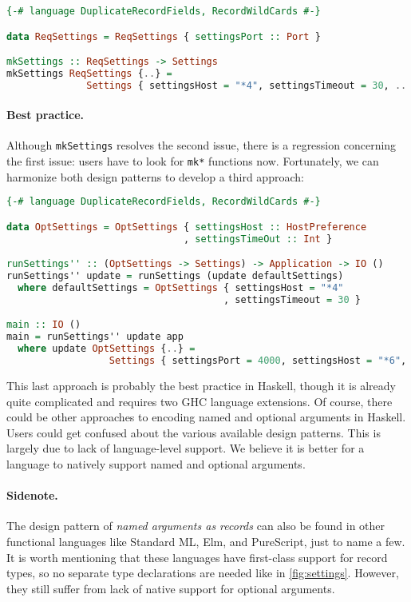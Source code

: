\begin{lstlisting}[language=Haskell]
{-# language DuplicateRecordFields, RecordWildCards #-}

data ReqSettings = ReqSettings { settingsPort :: Port }

mkSettings :: ReqSettings -> Settings
mkSettings ReqSettings {..} =
              Settings { settingsHost = "*4", settingsTimeout = 30, .. }
\end{lstlisting}

\paragraph{Best practice.}
Although \lstinline{mkSettings} resolves the second issue, there is a regression
concerning the first issue: users have to look for \lstinline{mk*} functions
now. Fortunately, we can harmonize both design patterns to develop a third
approach:

\begin{lstlisting}[language=Haskell]
{-# language DuplicateRecordFields, RecordWildCards #-}

data OptSettings = OptSettings { settingsHost :: HostPreference
                               , settingsTimeOut :: Int }

runSettings'' :: (OptSettings -> Settings) -> Application -> IO ()
runSettings'' update = runSettings (update defaultSettings)
  where defaultSettings = OptSettings { settingsHost = "*4"
                                      , settingsTimeout = 30 }

main :: IO ()
main = runSettings'' update app
  where update OptSettings {..} =
                  Settings { settingsPort = 4000, settingsHost = "*6", .. }
\end{lstlisting}

\noindent This last approach is probably the best practice in Haskell, though it
is already quite complicated and requires two GHC language extensions. Of
course, there could be other approaches to encoding named and optional arguments
in Haskell. Users could get confused about the various available design
patterns. This is largely due to lack of language-level support. We believe it
is better for a language to natively support named and optional arguments.

\paragraph{Sidenote.}
The design pattern of \emph{named arguments as records} can also be found in
other functional languages like Standard ML, Elm, and PureScript, just to name a
few. It is worth mentioning that these languages have first-class support for
record types, so no separate type declarations are needed like in
\autoref{fig:settings}. However, they still suffer from lack of native support
for optional arguments.
